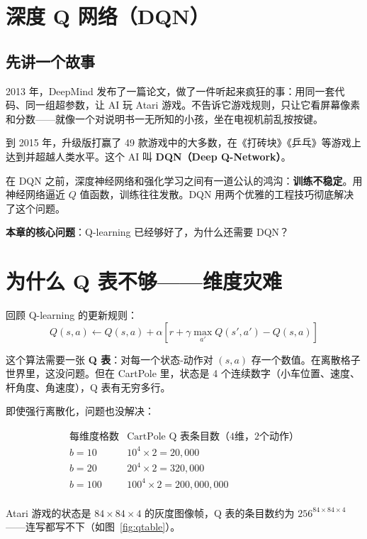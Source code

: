 \documentclass{article}
\begin{document}
\section*{深度 Q 网络（DQN）}

\subsection*{先讲一个故事}

2013 年，DeepMind 发布了一篇论文，做了一件听起来疯狂的事：用同一套代码、同一组超参数，让 AI 玩 Atari 游戏。不告诉它游戏规则，只让它看屏幕像素和分数——就像一个对说明书一无所知的小孩，坐在电视机前乱按按键。

到 2015 年，升级版打赢了 49 款游戏中的大多数，在《打砖块》《乒乓》等游戏上达到并超越人类水平。这个 AI 叫 \textbf{DQN（Deep Q-Network）}。

在 DQN 之前，深度神经网络和强化学习之间有一道公认的鸿沟：\textbf{训练不稳定}。用神经网络逼近 $Q$ 值函数，训练往往发散。DQN 用两个优雅的工程技巧彻底解决了这个问题。

\textbf{本章的核心问题}：Q-learning 已经够好了，为什么还需要 DQN？

\section*{为什么 Q 表不够——维度灾难}

回顾 Q-learning 的更新规则：
\[
Q(s,a) \leftarrow Q(s,a) + \alpha\!\left[r + \gamma \max_{a'} Q(s',a') - Q(s,a)\right]
\]

这个算法需要一张 \textbf{Q 表}：对每一个状态-动作对 $(s,a)$ 存一个数值。在离散格子世界里，这没问题。但在 CartPole 里，状态是 4 个连续数字（小车位置、速度、杆角度、角速度），Q 表有无穷多行。

即使强行离散化，问题也没解决：

\[
\begin{array}{c|c}
\text{每维度格数} & \text{CartPole Q 表条目数（4维，2个动作）} \\
\hline
b = 10  & 10^4 \times 2 = 20{,}000 \\
b = 20  & 20^4 \times 2 = 320{,}000 \\
b = 100 & 100^4 \times 2 = 200{,}000{,}000 \\
\end{array}
\]

Atari 游戏的状态是 $84 \times 84 \times 4$ 的灰度图像帧，Q 表的条目数约为 $256^{84\times 84\times 4}$——连写都写不下（如图~\ref{fig:qtable}）。
\end{document}
